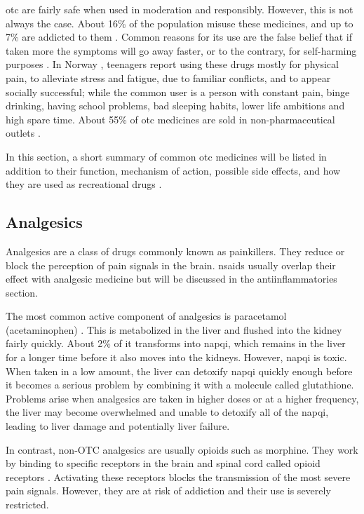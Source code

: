 \gls{otc} are fairly safe when used in moderation and responsibly. However, this is not always the case. About 16\% of the population misuse these medicines, and up to 7\% are addicted to them \cite{Algarni2021, ijerph18115530, PolandSelfMedicate, Lein2023}. Common reasons for its use are the false belief that if taken more the symptoms will go away faster, or to the contrary, for self-harming purposes \cite{Algarni2021}. In Norway \cite{Lorentzen2018}, teenagers report using these drugs mostly for physical pain, to alleviate stress and fatigue, due to familiar conflicts, and to appear socially successful; while the common user is a person with constant pain, binge drinking, having school problems, bad sleeping habits, lower life ambitions and high spare time. About 55\% of \gls{otc} medicines are sold in non-pharmaceutical outlets \cite{Lorentzen2018}.

In this section, a short summary of common \gls{otc} medicines will be listed in addition to their function, mechanism of action, possible side effects, and how they are used as recreational drugs \cite{otcAbuse2020}.

\subsection{Analgesics}

Analgesics are a class of drugs commonly known as painkillers. They reduce or block the perception of pain signals in the brain. \gls{nsaids} usually overlap their effect with analgesic medicine but will be discussed in the antiinflammatories section.

The most common active component of analgesics is paracetamol (acetaminophen) \cite{Brune2014}. This is metabolized in the liver and flushed into the kidney fairly quickly. About 2\% of it transforms into \gls{napqi}, which remains in the liver for a longer time before it also moves into the kidneys. However, \gls{napqi} is toxic. When taken in a low amount, the liver can detoxify \gls{napqi} quickly enough before it becomes a serious problem by combining it with a molecule called glutathione. Problems arise when analgesics are taken in higher doses or at a higher frequency, the liver may become overwhelmed and unable to detoxify all of the \gls{napqi}, leading to liver damage and potentially liver failure.

In contrast, non-OTC analgesics are usually opioids such as morphine. They work by binding to specific receptors in the brain and spinal cord called opioid receptors \cite{Schulz2004}. Activating these receptors blocks the transmission of the most severe pain signals. However, they are at risk of addiction and their use is severely restricted.

